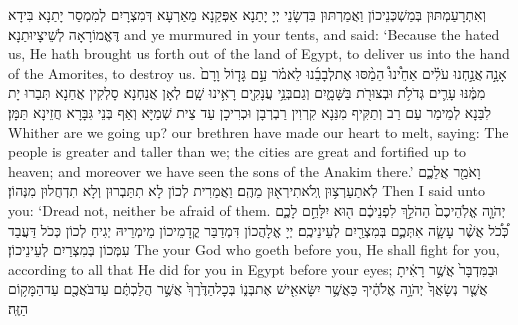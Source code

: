 {וְאִתְרָעַמְתּוּן בְּמַשְׁכְּנֵיכוֹן וַאֲמַרְתּוּן בִּדְשָׂנֵי יְיָ יָתַנָא אַפְּקַנָא מֵאַרְעָא דְּמִצְרָיִם לְמִמְסַר יָתַנָא בִּידָא דֶּאֱמוֹרָאָה לְשֵׁיצָיוּתַנָא׃}
{and ye murmured in your tents, and said: ‘Because the \lord\space hated us, He hath brought us forth out of the land of Egypt, to deliver us into the hand of the Amorites, to destroy us.}{}
{אָנָ֣ה \legarmeh  אֲנַ֣חְנוּ עֹלִ֗ים אַחֵ֩ינוּ֩ הֵמַ֨סּוּ אֶת\maqqaf לְבָבֵ֜נוּ לֵאמֹ֗ר עַ֣ם גָּד֤וֹל וָרָם֙ מִמֶּ֔נּוּ עָרִ֛ים גְּדֹלֹ֥ת וּבְצוּרֹ֖ת בַּשָּׁמָ֑יִם וְגַם\maqqaf בְּנֵ֥י עֲנָקִ֖ים רָאִ֥ינוּ שָֽׁם׃}
{לְאָן אֲנַחְנָא סָלְקִין אֲחַנָא תְּבַרוּ יָת לִבַּנָא לְמֵימַר עַם רַב וְתַקִּיף מִנַּנָא קִרְוִין רַבְרְבָן וּכְרִיכָן עַד צֵית שְׁמַיָּא וְאַף בְּנֵי גִּבָּרָא חֲזֵינָא תַּמָּן׃}
{Whither are we going up? our brethren have made our heart to melt, saying: The people is greater and taller than we; the cities are great and fortified up to heaven; and moreover we have seen the sons of the Anakim there.’}{}
{וָאֹמַ֖ר אֲלֵכֶ֑ם לֹֽא\maqqaf תַעַרְצ֥וּן וְֽלֹא\maqqaf תִירְא֖וּן מֵהֶֽם׃}
{וַאֲמַרִית לְכוֹן לָא תִתַּבְרוּן וְלָא תִדְחֲלוּן מִנְּהוֹן׃}
{Then I said unto you: ‘Dread not, neither be afraid of them.}{}
{יְהֹוָ֤ה אֱלֹֽהֵיכֶם֙ הַהֹלֵ֣ךְ לִפְנֵיכֶ֔ם ה֖וּא יִלָּחֵ֣ם לָכֶ֑ם כְּ֠כֹ֠ל אֲשֶׁ֨ר עָשָׂ֧ה אִתְּכֶ֛ם בְּמִצְרַ֖יִם לְעֵינֵיכֶֽם׃}
{יְיָ אֱלָהֲכוֹן דִּמְדַבַּר קֳדָמֵיכוֹן מֵימְרֵיהּ יְגִיחַ לְכוֹן כְּכֹל דַּעֲבַד עִמְּכוֹן בְּמִצְרַיִם לְעֵינֵיכוֹן׃}
{The \lord\space your God who goeth before you, He shall fight for you, according to all that He did for you in Egypt before your eyes;}{}
{וּבַמִּדְבָּר֙ אֲשֶׁ֣ר רָאִ֔יתָ אֲשֶׁ֤ר נְשָׂאֲךָ֙ יְהֹוָ֣ה אֱלֹהֶ֔יךָ כַּאֲשֶׁ֥ר יִשָּׂא\maqqaf אִ֖ישׁ אֶת\maqqaf בְּנ֑וֹ בְּכׇל\maqqaf הַדֶּ֙רֶךְ֙ אֲשֶׁ֣ר הֲלַכְתֶּ֔ם עַד\maqqaf בֹּאֲכֶ֖ם עַד\maqqaf הַמָּק֥וֹם הַזֶּֽה׃}
